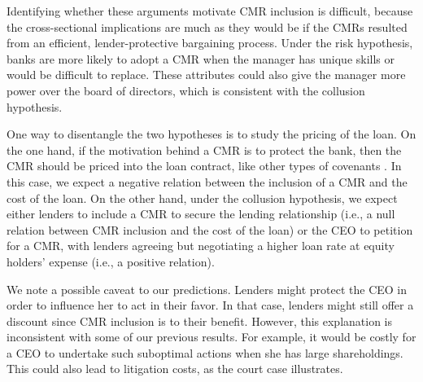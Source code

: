 \documentclass[a4paper,12pt]{article}
\begin{document}
Identifying whether these arguments motivate CMR inclusion is difficult, because the cross-sectional implications are much as they would be if the CMRs resulted from an efficient, lender-protective bargaining process.
Under the risk hypothesis, banks are more likely to adopt a CMR when the manager has unique skills or would be difficult to replace.
These attributes could also give the manager more power over the board of directors, which is consistent with the collusion hypothesis.



One way to disentangle the two hypotheses is to study the pricing of the loan.
On the one hand, if the motivation behind a CMR is to protect the bank, then the CMR should be priced into the loan contract, like other types of covenants \citep[see, e.g.,][]{Bradley_2015}.
In this case, we expect a negative relation between the inclusion of a CMR and the cost of the loan.
On the other hand, under the collusion hypothesis, we expect either lenders to include a CMR to secure the lending relationship (i.e., a null relation between CMR inclusion and the cost of the loan) or the CEO to petition for a CMR, with lenders agreeing but negotiating a higher loan rate at equity holders' expense (i.e., a positive relation).



We note a possible caveat to our predictions.
Lenders might protect the CEO in order to influence her to act in their favor.
In that case, lenders might still offer a discount since CMR inclusion is to their benefit.
However, this explanation is inconsistent with some of our previous results.
For example, it would be costly for a CEO to undertake such suboptimal actions when she has large shareholdings.
This could also lead to litigation costs, as the court case illustrates.
\end{document}
